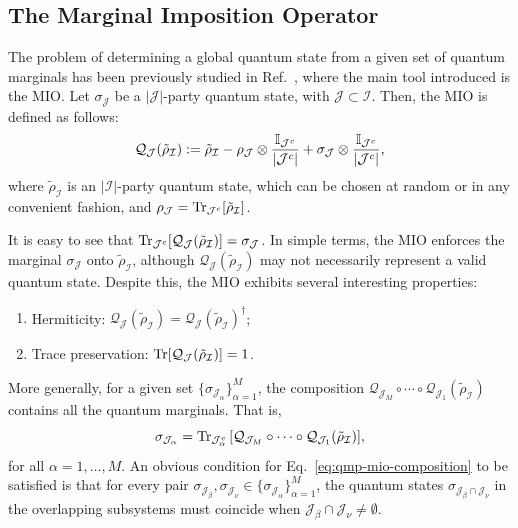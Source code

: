\subsection{The Marginal Imposition Operator}
\label{sec:qmp-mio}

The problem of determining a global quantum state from a given set of quantum marginals has been previously studied in Ref.~\cite{uzcategui2022mio}, where the main tool introduced is the MIO. Let $\sigma_{\mathcal{J}}$ be a $|\mathcal{J}|$-party quantum state, with $\mathcal{J} \subset \mathcal{I}$. Then, the MIO is defined as follows:
\begin{equation}
\label{eq:qmp-mio}
\mathcal{Q}_{\mathcal{J}}(\tilde{\rho}_{\mathcal{I}}) :=
\tilde{\rho}_{\mathcal{I}}
- \rho_{\mathcal{J}} \otimes \frac{\mathbb{I}_{\mathcal{J}^c}}{\abs{\mathcal{J}^c}}
+ \sigma_{\mathcal{J}} \otimes \frac{\mathbb{I}_{\mathcal{J}^c}}{\abs{\mathcal{J}^c}},
\end{equation}
where $\tilde{\rho}_{\mathcal{I}}$ is an $|\mathcal{I}|$-party quantum state, which can be chosen at random or in any convenient fashion, and $\rho_{\mathcal{J}} = \Tr_{\mathcal{J}^c}[\tilde{\rho}_{\mathcal{I}}]$.

It is easy to see that $\Tr_{\mathcal{J}^c}[\mathcal{Q}_{\mathcal{J}}(\tilde{\rho}_{\mathcal{I}})] = \sigma_{\mathcal{J}}$. In simple terms, the MIO enforces the marginal $\sigma_{\mathcal{J}}$ onto $\tilde{\rho}_{\mathcal{I}}$, although $\mathcal{Q}_{\mathcal{J}}(\tilde{\rho}_{\mathcal{I}})$ may not necessarily represent a valid quantum state. Despite this, the MIO exhibits several interesting properties:
\begin{enumerate}[label=(\roman*)]
\item Hermiticity: $\mathcal{Q}_{\mathcal{J}}(\tilde{\rho}_{\mathcal{I}}) = \mathcal{Q}_{\mathcal{J}}(\tilde{\rho}_{\mathcal{I}})^\dagger$;
\item Trace preservation: $\Tr[\mathcal{Q}_{\mathcal{J}}(\tilde{\rho}_{\mathcal{I}})] = 1$.
\end{enumerate}

More generally, for a given set $\{\sigma_{\mathcal{J}_\alpha}\}_{\alpha=1}^{M}$, the composition $\mathcal{Q}_{\mathcal{J}_M} \circ \cdots \circ \mathcal{Q}_{\mathcal{J}_1}(\tilde{\rho}_{\mathcal{I}})$ contains all the quantum marginals. That is,
\begin{equation}
\label{eq:qmp-mio-composition}
\sigma_{\mathcal{J}_\alpha} = \Tr_{\mathcal{J}_\alpha^c}\qty[ \mathcal{Q}_{\mathcal{J}_M} \circ \cdots \circ \mathcal{Q}_{\mathcal{J}_1}(\tilde{\rho}_{\mathcal{I}}) ],
\end{equation}
for all $\alpha = 1, \ldots, M$. An obvious condition for Eq.~\eqref{eq:qmp-mio-composition} to be satisfied is that for every pair $\sigma_{\mathcal{J}_\beta}, \sigma_{\mathcal{J}_\nu} \in \{\sigma_{\mathcal{J}_\alpha}\}_{\alpha=1}^{M}$, the quantum states $\sigma_{\mathcal{J}_\beta \cap \mathcal{J}_\nu}$ in the overlapping subsystems must coincide when $\mathcal{J}_\beta \cap \mathcal{J}_\nu \neq \emptyset$.


